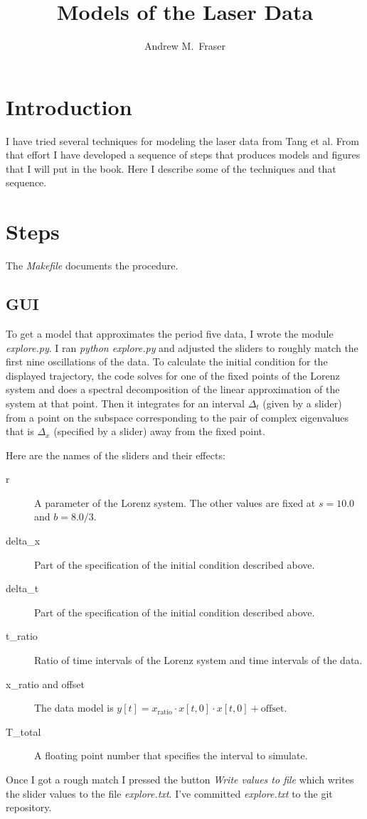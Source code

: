 \documentclass[12pt]{article}
\title{Models of the Laser Data}
\author{Andrew M.\ Fraser}
\begin{document}
\maketitle

\section{Introduction}
\label{sec:introduction}

I have tried several techniques for modeling the laser data from Tang
et al.  From that effort I have developed a sequence of steps that
produces models and figures that I will put in the book.  Here I
describe some of the techniques and that sequence.

\section{Steps}
\label{sec:steps}

The \emph{Makefile} documents the procedure.

\subsection{GUI}
\label{sec:gui}

To get a model that approximates the period five data, I wrote the
module \emph{explore.py}.  I ran \emph{python explore.py} and adjusted
the sliders to roughly match the first nine oscillations of the data.
To calculate the initial condition for the displayed trajectory, the
code solves for one of the fixed points of the Lorenz system and does
a spectral decomposition of the linear approximation of the system at
that point.  Then it integrates for an interval $\Delta_t$ (given by a
slider) from a point on the subspace corresponding to the pair of
complex eigenvalues that is $\Delta_x$ (specified by a slider) away
from the fixed point.

Here are the names of the sliders and their effects:
\begin{description}
\item[r] A parameter of the Lorenz system.  The other values are fixed
  at $s=10.0$ and $b=8.0/3$.
\item[delta\_x] Part of the specification of the initial condition
  described above.
\item[delta\_t] Part of the specification of the initial condition
  described above.
\item[t\_ratio] Ratio of time intervals of the Lorenz system and time
  intervals of the data.
\item[x\_ratio and offset] The data model is $y[t] = x_{\text{ratio}} \cdot
  x[t,0] \cdot x[t,0] + \text{offset}$.
\item[T\_total] A floating point number that specifies the interval to
  simulate.
\end{description}
Once I got a rough match I pressed the button \emph{Write values to
  file} which writes the slider values to the file \emph{explore.txt}.
I've committed \emph{explore.txt} to the git repository.
\end{document}

